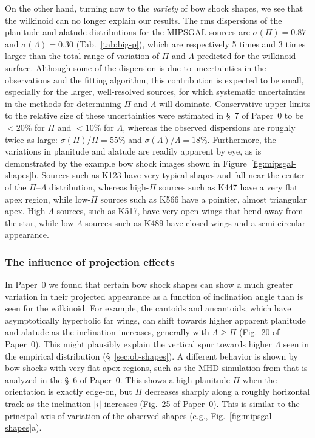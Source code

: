 \documentclass[useAMS, usenatbib, a4paper]{mnras}
\providecommand{\abs}[1]{\lvert#1\rvert}
\begin{document}
On the other hand, turning now to the \emph{variety} of bow shock
shapes, we see that the wilkinoid can no longer explain our results.
The rms dispersions of the planitude and alatude distributions for the
MIPSGAL sources are \(\sigma(\Pi) = 0.87\) and
\(\sigma(\Lambda) = 0.30\) (Tab.~\ref{tab:big-p}), which are respectively 5 times
and 3 times larger than the total range of variation of \(\Pi\) and
\(\Lambda\) predicted for the wilkinoid surface.  Although some of the
dispersion is due to uncertainties in the observations and the fitting
algorithm, this contribution is expected to be small, especially for
the larger, well-resolved sources, for which systematic uncertainties
in the methods for determining \(\Pi\) and \(\Lambda\) will
dominate. Conservative upper limits to the relative size of these
uncertainties were estimated in \S~7 of Paper~0 to be \(< 20\%\) for
\(\Pi\) and \(< 10\%\) for \(\Lambda\), whereas the observed dispersions are
roughly twice as large: \(\sigma(\Pi)/\Pi = 55\%\) and
\(\sigma(\Lambda)/\Lambda = 18\%\).  Furthermore, the variations in planitude and
alatude are readily apparent by eye, as is demonstrated by the example
bow shock images shown in Figure~\ref{fig:mipsgal-shapes}b.  Sources
such as K123 have very typical shapes and fall near the center of the
\(\Pi\)--\(\Lambda\) distribution, whereas high-\(\Pi\) sources such as K447 have
a very flat apex region, while low-\(\Pi\) sources such as K566 have a
pointier, almost triangular apex.  High-\(\Lambda\) sources, such as K517,
have very open wings that bend away from the star, while
low-\(\Lambda\) sources such as K489 have closed wings and a semi-circular
appearance.

\subsubsection{The influence of projection effects}
\label{sec:infl-proj-effects}



In Paper~0 we found that certain bow shock shapes can show a much
greater variation in their projected appearance as a function of
inclination angle than is seen for the wilkinoid.  For example, the
cantoids and ancantoids, which have asymptotically hyperbolic far
wings, can shift towards higher apparent planitude and alatude as the
inclination increases, generally with \(\Lambda \ge \Pi\) (Fig.~20 of Paper~0).
This might plausibly explain the vertical spur towards higher
\(\Lambda\) seen in the empirical distribution (\S~\ref{sec:ob-shapes}). A
different behavior is shown by bow shocks with very flat apex regions,
such as the MHD simulation from \citet{Meyer:2017a} that is analyzed
in the \S~6 of Paper~0.  This shows a high planitude \(\Pi\) when the
orientation is exactly edge-on, but \(\Pi\) decreases sharply along a
roughly horizontal track as the inclination \(\abs{i}\) increases
(Fig.~25 of Paper~0).  This is similar to the principal axis of
variation of the observed shapes (e.g.,
Fig.~\ref{fig:mipsgal-shapes}a).
\end{document}
